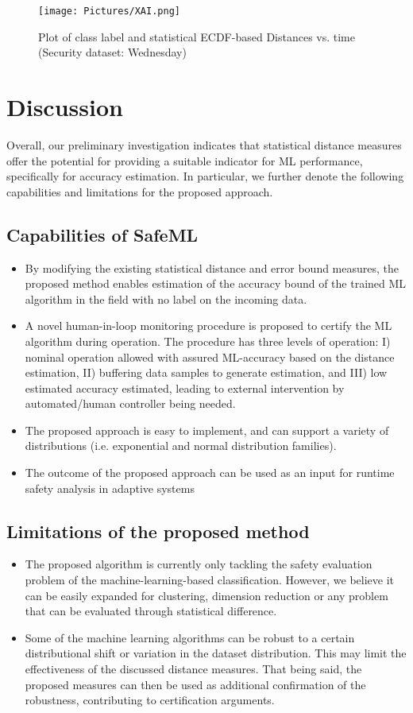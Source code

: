 \documentclass{article}
\begin{document}
\begin{figure}
\texttt{[image: Pictures/XAI.png]}
\caption{Plot of class label and statistical ECDF-based Distances vs. time (Security dataset: Wednesday)} \label{fig_XAI}
\end{figure}



\section{Discussion} \label{section-discussion}
Overall, our preliminary investigation indicates that statistical distance measures offer the potential for providing a suitable indicator for ML performance, specifically for accuracy estimation. In particular, we further denote the following capabilities and limitations for the proposed approach.
\subsection{Capabilities of SafeML}
\begin{itemize}
 \item By modifying the existing statistical distance and error bound measures, the proposed method enables estimation of the accuracy bound of the trained ML algorithm in the field with no label on the incoming data.
 \item A novel human-in-loop monitoring procedure is proposed to certify the ML algorithm during operation. The procedure has three levels of operation: I) nominal operation allowed with assured ML-accuracy based on the distance estimation, II) buffering data samples to generate estimation, and III) low estimated accuracy estimated, leading to external intervention by automated/human controller being needed. 
 \item The proposed approach is easy to implement, and can support a variety of distributions (i.e. exponential and normal distribution families).
 \item The outcome of the proposed approach can be used as an input for runtime safety analysis in adaptive systems \cite{kabir2019runtime,papadopoulos2019model}
\end{itemize}
\subsection{Limitations of the proposed method}
\begin{itemize}
\item The proposed algorithm is currently only tackling the safety evaluation problem of the machine-learning-based classification. However, we believe it can be easily expanded for clustering, dimension reduction or any problem that can be evaluated through statistical difference.
\item Some of the machine learning algorithms can be robust to a certain distributional shift or variation in the dataset distribution. This may limit the effectiveness of the discussed distance measures. That being said, the proposed measures can then be used as additional confirmation of the robustness, contributing to certification arguments.
\end{itemize}
\end{document}
